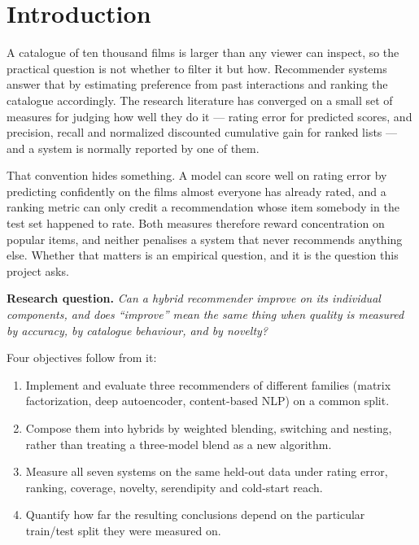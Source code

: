 \documentclass[10pt,twocolumn,letterpaper]{article}
\begin{document}
\section{Introduction}

A catalogue of ten thousand films is larger than any viewer can inspect, so
the practical question is not whether to filter it but how. Recommender
systems answer that by estimating preference from past interactions and
ranking the catalogue accordingly. The research literature has converged on a
small set of measures for judging how well they do it --- rating error for
predicted scores, and precision, recall and normalized discounted cumulative
gain for ranked lists --- and a system is normally reported by one of them.

That convention hides something. A model can score well on rating error by
predicting confidently on the films almost everyone has already rated, and a
ranking metric can only credit a recommendation whose item somebody in the
test set happened to rate. Both measures therefore reward concentration on
popular items, and neither penalises a system that never recommends anything
else. Whether that matters is an empirical question, and it is the question
this project asks.

\noindent\textbf{Research question.} \textit{Can a hybrid recommender improve
on its individual components, and does ``improve'' mean the same thing when
quality is measured by accuracy, by catalogue behaviour, and by novelty?}

\noindent Four objectives follow from it:

\begin{enumerate}\itemsep2pt
\item Implement and evaluate three recommenders of different families
      (matrix factorization, deep autoencoder, content-based NLP) on a
      common split.
\item Compose them into hybrids by weighted blending, switching and nesting,
      rather than treating a three-model blend as a new algorithm.
\item Measure all seven systems on the same held-out data under rating error,
      ranking, coverage, novelty, serendipity and cold-start reach.
\item Quantify how far the resulting conclusions depend on the particular
      train/test split they were measured on.
\end{enumerate}
\end{document}
